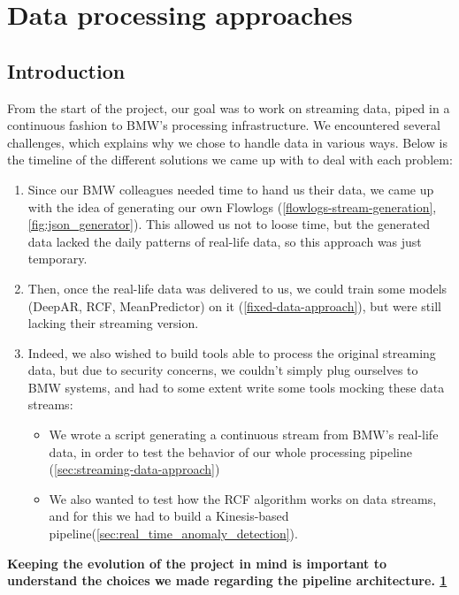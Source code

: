  \section{Data processing approaches}\label{data-processing-approaches}
        
\subsection{Introduction}\label{data-processing-intro}

From the start of the project, our goal was to work on streaming data, piped in a continuous fashion to BMW's processing infrastructure. We encountered several challenges, which explains why we chose to handle data in various ways. Below is the timeline of the different solutions we came up with to deal with each problem:

\begin{enumerate}
    \item Since our BMW colleagues needed time to hand us their data, we came up with the idea of generating our own Flowlogs (\ref{flowlogs-stream-generation},\ref{fig:json_generator}). This allowed us not to loose time, but the generated data lacked the daily patterns of real-life data, so this approach was just temporary.
    \item Then, once the real-life data was delivered to us, we could train some models (DeepAR, RCF, MeanPredictor) on it (\ref{fixed-data-approach}), but were still lacking their streaming version.
    \item Indeed, we also wished to build tools able to process the original streaming data, but due to security concerns, we couldn't simply plug ourselves to BMW systems, and had to some extent write some tools mocking these data streams:\\
    \begin{itemize}
        \item We wrote a script generating a continuous stream from BMW's real-life data, in order to test the behavior of our whole processing pipeline (\ref{sec:streaming-data-approach})
        \item We also wanted to test how the RCF algorithm works on data streams, and for this we had to build a Kinesis-based pipeline(\ref{sec:real_time_anomaly_detection}).
    \end{itemize}
\end{enumerate}

\textbf{Keeping the evolution of the project in mind is important to understand the choices we made regarding the pipeline architecture.  \ref{data-processing-approaches}}
        
